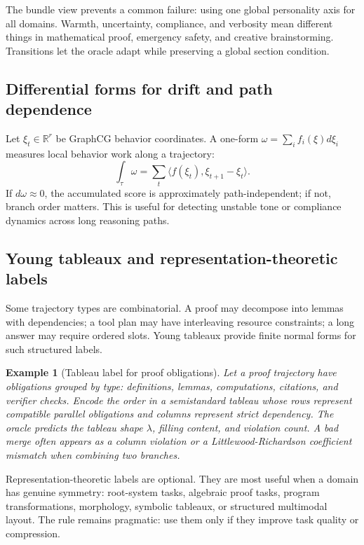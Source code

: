 \documentclass[11pt]{article}
\newtheorem{example}[theorem]{Example}
\newcommand{\RR}{\mathbb{R}}
\numberwithin{equation}{section}
\begin{document}
The bundle view prevents a common failure: using one global personality axis for all domains. Warmth, uncertainty, compliance, and verbosity mean different things in mathematical proof, emergency safety, and creative brainstorming. Transitions let the oracle adapt while preserving a global section condition.

\subsection{Differential forms for drift and path dependence}
Let $\xi_t\in\RR^r$ be GraphCG behavior coordinates. A one-form $\omega=\sum_i f_i(\xi)d\xi_i$ measures local behavior work along a trajectory:
\begin{equation}
\int_\tau \omega = \sum_t \langle f(\xi_t),\xi_{t+1}-\xi_t\rangle.
\end{equation}
If $d\omega\approx0$, the accumulated score is approximately path-independent; if not, branch order matters. This is useful for detecting unstable tone or compliance dynamics across long reasoning paths.

\subsection{Young tableaux and representation-theoretic labels}
Some trajectory types are combinatorial. A proof may decompose into lemmas with dependencies; a tool plan may have interleaving resource constraints; a long answer may require ordered slots. Young tableaux provide finite normal forms for such structured labels.

\begin{example}[Tableau label for proof obligations]
Let a proof trajectory have obligations grouped by type: definitions, lemmas, computations, citations, and verifier checks. Encode the order in a semistandard tableau whose rows represent compatible parallel obligations and columns represent strict dependency. The oracle predicts the tableau shape $\lambda$, filling content, and violation count. A bad merge often appears as a column violation or a Littlewood-Richardson coefficient mismatch when combining two branches.
\end{example}

Representation-theoretic labels are optional. They are most useful when a domain has genuine symmetry: root-system tasks, algebraic proof tasks, program transformations, morphology, symbolic tableaux, or structured multimodal layout. The rule remains pragmatic: use them only if they improve task quality or compression.
\end{document}
